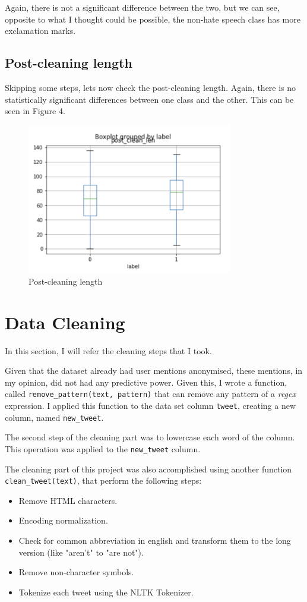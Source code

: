 \documentclass{article}
\begin{document}
	Again, there is not a significant difference between the two, but we can see, opposite to what I thought could be possible, the non-hate speech class has more exclamation marks. 
		
	\subsection{Post-cleaning length}
	
	Skipping some steps, lets now check the post-cleaning length. Again, there is no statistically  significant differences between one class and the other. This can be seen in Figure 4. 
	
	\begin{figure}[h]
		\label{Figure 3}
		\caption{Post-cleaning length}
		\includegraphics[width=9cm]{post.png}
		\centering
	\end{figure}

	\section{Data Cleaning}
	
	In this section, I will refer the cleaning steps that I took.
	
	Given that the dataset already had user mentions anonymised, these mentions, in my opinion, did not had any predictive power. Given this, I wrote a function, called \texttt{remove\_pattern(text, pattern)} that can remove any pattern of a \textit{regex} expression. I applied this function to the data set column \texttt{tweet}, creating a new column, named \texttt{new\_tweet}.
	
	The second step of the cleaning part was to lowercase each word of the column. This operation was applied to the \texttt{new\_tweet} column. 
	
	The cleaning part of this project was also accomplished using another function \texttt{clean\_tweet(text)}, that perform the following steps:
	\begin{itemize}
		\item Remove HTML characters.
		\item Encoding normalization.
		\item Check for common abbreviation in english and transform them to the long version (like "aren't" to "are not").
		\item Remove non-character symbols.
		\item Tokenize each tweet using the NLTK Tokenizer.
	\end{itemize}
	
\end{document}
